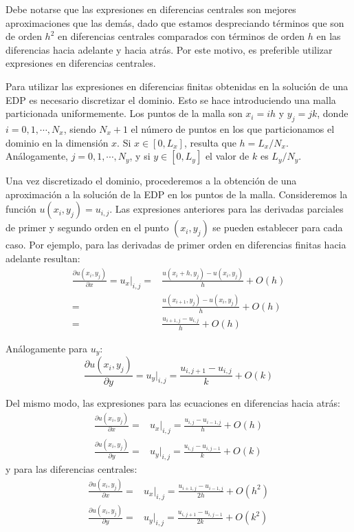 Debe notarse que las expresiones en diferencias centrales son mejores aproximaciones que las demás, dado que estamos despreciando términos que son de orden $h^2$ en diferencias centrales comparados con términos de orden $h$ en las diferencias hacia adelante y hacia atrás. Por este motivo, es preferible utilizar expresiones en diferencias centrales.

Para utilizar las expresiones en diferencias finitas obtenidas en la solución de una EDP es necesario discretizar el dominio. Esto se hace introduciendo una malla particionada uniformemente. Los puntos de la malla son $x_i = i h$ y $y_j = j k$, donde $i = 0, 1, \cdots, N_x$, siendo $N_x + 1$ el número de puntos en los que particionamos el dominio en la dimensión $x$. Si $x \in [0, L_x]$, resulta que $h = L_x / N_x$. Análogamente, $j = 0, 1, \cdots, N_y$, y si $y \in [0, L_y]$ el valor de $k$ es $L_y/N_y$.

Una vez discretizado el dominio, procederemos a la obtención de una aproximación a la solución de la EDP en los puntos de la malla. Consideremos la función $u(x_i, y_j) =u_{i,j}$. Las expresiones anteriores para las derivadas parciales de primer y segundo orden en el punto $(x_i, y_j)$ se pueden establecer para cada caso. Por ejemplo, para las derivadas de primer orden en diferencias finitas hacia adelante resultan:
\begin{align*} 
 \frac{\partial u(x_i, y_j)}{\partial x} = u_x \Bigr|_{i,j} =& \frac{u(x_i + h, y_j) - u(x_i, y_j)}{h} + O(h) \\
                  =& \frac{u(x_{i+1}, y_j) - u(x_i, y_j)}{h} + O(h) \\
                  =& \frac{u_{i+1, j} - u_{i,j}}{h} + O(h)
\end{align*}

Análogamente para $u_y$:
\begin{equation*}
 \frac{\partial u(x_i, y_j)}{\partial y} = u_y \Bigr|_{i,j} = \frac{u_{i, j+1} - u_{i,j}}{k} + O(k)
\end{equation*} 

Del mismo modo, las expresiones para las ecuaciones en diferencias hacia atrás:
\begin{align*}
 \frac{\partial u(x_i, y_j)}{\partial x} =& u_x \Bigr|_{i,j} = \frac{u_{i, j} - u_{i-1,j}}{h} + O(h) \\
 \frac{\partial u(x_i, y_j)}{\partial y} =& u_y \Bigr|_{i,j} = \frac{u_{i, j} - u_{i,j-1}}{k} + O(k)
\end{align*}
y para las diferencias centrales:
\begin{align*}
 \frac{\partial u(x_i, y_j)}{\partial x} =& u_x \Bigr|_{i,j} = \frac{u_{i+1, j} - u_{i-1,j}}{2h} + O(h^2) \\
 \frac{\partial u(x_i, y_j)}{\partial y} =& u_y \Bigr|_{i,j} = \frac{u_{i, j+1} - u_{i,j-1}}{2k} + O(k^2)
\end{align*}

